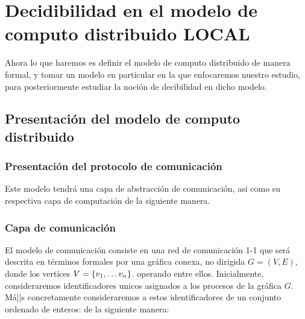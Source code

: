 \documentclass[10pt]{report}
\begin{document}
    \section{Decidibilidad en el modelo de computo distribuido  \textbf{LOCAL}}\label{sec:decidibilidad-en-el-modelo-de-computo-distribuidotextbf}
    Ahora lo que haremos es definir el modelo de computo distribuido de manera formal,
    y tomar un modelo en particular en la que enfocaremos nuestro estudio, para posteriormente
    estudiar la noción de decibilidad en dicho modelo.


    \subsection{Presentación del modelo de computo distribuido}\label{subsec:presentación-del-modelo-de-computo-distribuido}
    \subsubsection{Presentación del protocolo de comunicación}
    Este modelo tendrá una capa de abstracción de comunicación, asi como su respectiva capa de
    computación de la siguiente manera.
    \subsubsection{Capa de comunicación}
    El modelo de comunicación consiste en una red de comunicación 1-1 que será descrita en términos formales por
    una gráfica conexa, no dirigida $G=(V,E)$, donde los vertices $V=\{ v_{1},\mathellipsis v_{n} \}$.
    operando entre ellos.
    Inicialmente, consideraremos identificadores unicos asignados a los procesos de la gráfica $G$.\space
    Má||s concretamente consideraremos a estos identificadores de un conjunto ordenado de enteros:
    de la siguiente manera:
\end{document}
